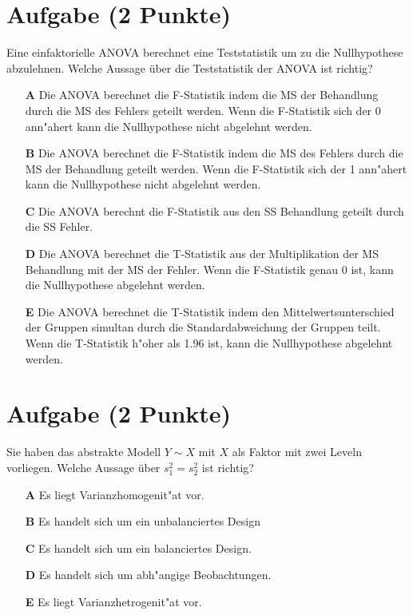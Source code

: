 \documentclass[a4paper, 10pt]{scrartcl}\usepackage[]{graphicx}\usepackage[]{xcolor}
\begin{document}
\section{Aufgabe \hfill (2 Punkte)}

Eine einfaktorielle ANOVA berechnet eine Teststatistik um zu die Nullhypothese abzulehnen. Welche Aussage {\"u}ber die Teststatistik der ANOVA ist richtig?



\begin{enumerate}
\item [\textbf{A} \msquare] Die ANOVA berechnet die F-Statistik indem die MS der Behandlung durch die MS des Fehlers geteilt werden. Wenn die F-Statistik sich der 0 ann{"a}hert kann die Nullhypothese nicht abgelehnt werden.
\item [\textbf{B} \msquare] Die ANOVA berechnet die F-Statistik indem die MS des Fehlers durch die MS der Behandlung geteilt werden. Wenn die F-Statistik sich der 1 ann{"a}hert kann die Nullhypothese nicht abgelehnt werden.
\item [\textbf{C} \msquare] Die ANOVA berechnt die F-Statistik aus den SS Behandlung geteilt durch die SS Fehler.
\item [\textbf{D} \msquare] Die ANOVA berechnet die T-Statistik aus der Multiplikation der MS Behandlung mit der MS der Fehler. Wenn die F-Statistik genau 0 ist, kann die Nullhypothese abgelehnt werden.
\item [\textbf{E} \msquare] Die ANOVA berechnet die T-Statistik indem den Mittelwertsunterschied der Gruppen simultan durch die Standardabweichung der Gruppen teilt. Wenn die T-Statistik h{"o}her als 1.96 ist, kann die Nullhypothese abgelehnt werden.
\end{enumerate} 

\section{Aufgabe \hfill (2 Punkte)}




Sie haben das abstrakte Modell $Y \sim X$ mit $X$ als Faktor mit zwei
Leveln vorliegen. Welche Aussage {\"u}ber $s^2_1 = s^2_2$ ist richtig?



\begin{enumerate}
\item [\textbf{A} \msquare] Es liegt Varianzhomogenit{"a}t vor.
\item [\textbf{B} \msquare] Es handelt sich um ein unbalanciertes Design
\item [\textbf{C} \msquare] Es handelt sich um ein balanciertes Design.
\item [\textbf{D} \msquare] Es handelt sich um abh{"a}ngige Beobachtungen.
\item [\textbf{E} \msquare] Es liegt Varianzhetrogenit{"a}t vor.
\end{enumerate} 
\end{document}
